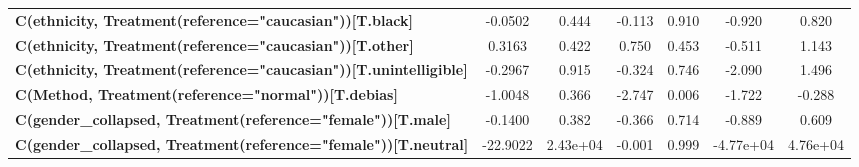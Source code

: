 \begin{center}
\begin{tabular}{lcccccc}
\textbf{C(ethnicity, Treatment(reference="caucasian"))[T.black]}          &      -0.0502  &        0.444     &    -0.113  &         0.910        &       -0.920    &        0.820     \\
\textbf{C(ethnicity, Treatment(reference="caucasian"))[T.other]}          &       0.3163  &        0.422     &     0.750  &         0.453        &       -0.511    &        1.143     \\
\textbf{C(ethnicity, Treatment(reference="caucasian"))[T.unintelligible]} &      -0.2967  &        0.915     &    -0.324  &         0.746        &       -2.090    &        1.496     \\
\textbf{C(Method, Treatment(reference="normal"))[T.debias]}               &      -1.0048  &        0.366     &    -2.747  &         0.006        &       -1.722    &       -0.288     \\
\textbf{C(gender\_collapsed, Treatment(reference="female"))[T.male]}      &      -0.1400  &        0.382     &    -0.366  &         0.714        &       -0.889    &        0.609     \\
\textbf{C(gender\_collapsed, Treatment(reference="female"))[T.neutral]}   &     -22.9022  &     2.43e+04     &    -0.001  &         0.999        &    -4.77e+04    &     4.76e+04     \\
\bottomrule
\end{tabular}
\end{center}